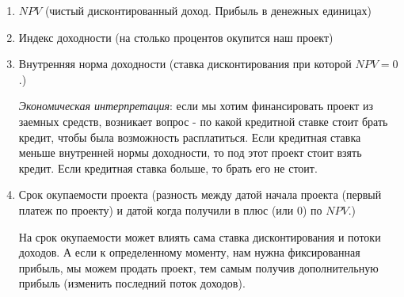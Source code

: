 \documentclass[reqno]{article}
\theoremstyle{definition}
\theoremstyle{definition}
\theoremstyle{definition}
\theoremstyle{definition}
\theoremstyle{definition}
\theoremstyle{definition}
\theoremstyle{definition}
\theoremstyle{definition}
\theoremstyle{definition}
\begin{document}
	\begin{enumerate}
		\item $NPV$ (чистый дисконтированный доход. Прибыль в денежных единицах)
		
		\item Индекс доходности (на столько процентов окупится наш проект)
		
		\item Внутренняя норма доходности (ставка дисконтирования при которой $NPV = 0$.)
		
		\setlength{\leftskip}{2em}
		\emph{Экономическая интерпретация}: если мы хотим финансировать проект из заемных средств, возникает вопрос - по какой кредитной ставке стоит брать кредит, чтобы была возможность расплатиться. Если кредитная ставка меньше внутренней нормы доходности, то под этот проект стоит взять кредит. Если кредитная ставка больше, то брать его не стоит.
		
		\setlength{\leftskip}{0em}
		\item Срок окупаемости проекта (разность между датой начала проекта (первый платеж по проекту) и датой когда получили в плюс (или 0) по $NPV$.)
		
		\setlength{\leftskip}{2em}
		На срок окупаемости может влиять сама ставка дисконтирования и потоки доходов. А  если к определенному моменту, нам нужна фиксированная прибыль, мы можем продать проект, тем самым получив дополнительную прибыль (изменить последний поток доходов).
	\end{enumerate}
	
\end{document}
